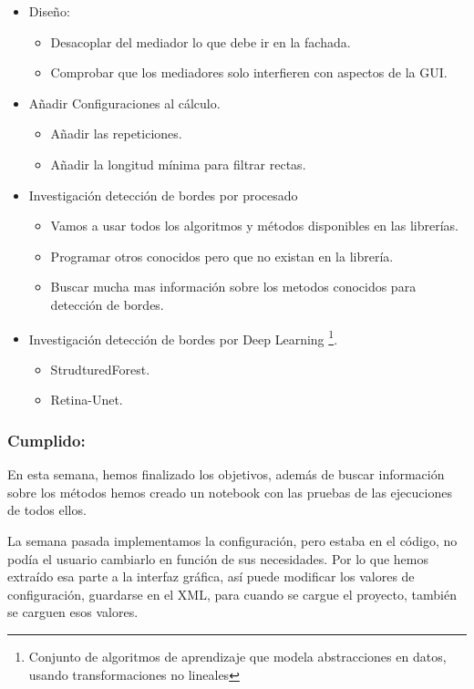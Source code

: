 \begin{itemize}
	\item Diseño:
		\begin{itemize}
			\item Desacoplar del mediador lo que debe ir en la fachada.
			\item Comprobar que los mediadores solo interfieren con aspectos de la GUI.
		\end{itemize}	
	\item Añadir Configuraciones al cálculo.
		\begin{itemize}
			\item Añadir las repeticiones.
			\item Añadir la longitud mínima para filtrar rectas.
		\end{itemize}
		\item Investigación detección de bordes por procesado
			\begin{itemize}
				\item Vamos a usar todos los algoritmos y métodos disponibles en las librerías.
				\item Programar otros conocidos pero que no existan en la librería.
				\item Buscar mucha mas información sobre los metodos conocidos para detección de bordes.
			\end{itemize}					
		\item Investigación detección de bordes por Deep Learning \cite{wiki:deep} \footnote{Conjunto de algoritmos de aprendizaje que modela abstracciones en datos, usando transformaciones no lineales}.
			\begin{itemize}
				\item StrudturedForest.
				\item Retina-Unet. 
			\end{itemize}
\end{itemize}
\subsubsection{Cumplido:}
En esta semana, hemos finalizado los objetivos, además de buscar información sobre los métodos hemos creado un notebook con las pruebas de las ejecuciones de todos ellos.

La semana pasada implementamos la configuración, pero estaba en el código, no podía el usuario cambiarlo en función de sus necesidades.
Por lo que hemos extraído esa parte a la interfaz gráfica, así puede modificar los valores de configuración, guardarse en el XML, para cuando se cargue el proyecto, también se carguen esos valores.

